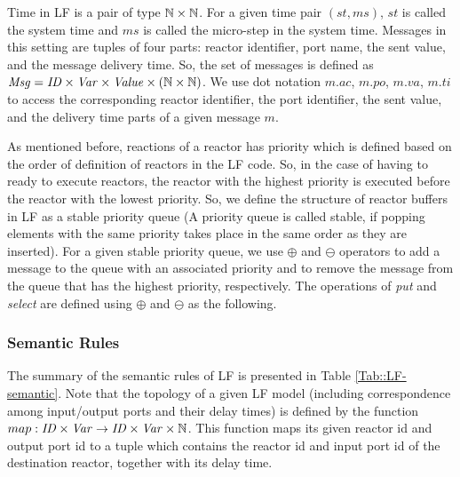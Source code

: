 Time in LF is a pair of type $\mathbb{N} \times \mathbb{N}$. For a given time pair $(st,ms)$, $st$ is called the system time and $ms$ is called the micro-step in the system time. Messages in this setting are tuples of four parts: reactor identifier, port name, the sent value, and the message delivery time. So, the set of messages is defined as $\mathit{Msg} = \mathit{ID} \times \mathit{Var} \times \mathit{Value} \times (\mathbb{N} \times \mathbb{N})$. We use dot notation $m.ac$, $m.po$, $m.va$, $m.ti$ to access the corresponding reactor identifier, the port identifier, the sent value, and the delivery time parts of a given message $m$.

As mentioned before, reactions of a reactor has priority which is defined based on the order of definition of reactors in the LF code. So, in the case of having to ready to execute reactors, the reactor with the highest priority is executed before the reactor with the lowest priority. So, we define the structure of reactor buffers in LF as a stable priority queue (A priority queue is called stable, if popping elements with the same priority takes place in the same order as they are inserted). For a given stable priority queue, we use $\oplus$ and $\ominus$ operators to add a message to the queue with an associated priority and to remove the message from the queue that has the highest priority, respectively. The operations of \emph{put} and \emph{select} are defined using $\oplus$ and $\ominus$ as the following. 


\subsubsection{Semantic Rules}
The summary of the semantic rules of LF is presented in Table \ref{Tab::LF-semantic}. Note that the topology of a given LF model (including correspondence among input/output ports and their delay times) is defined by the function $map: \mathit{ID} \times \mathit{Var} \rightarrow \mathit{ID} \times \mathit{Var} \times \mathbb{N}$. This function maps its given reactor id and output port id to a tuple which contains the reactor id and input port id of the destination reactor, together with its delay time.

